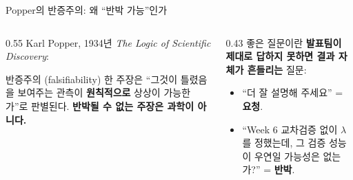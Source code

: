 \begin{frame}{Popper의 반증주의: 왜 ``반박 가능''인가}
  \begin{columns}[T]
    \begin{column}{0.55\textwidth}
      Karl Popper, 1934년 \textit{The Logic of Scientific
      Discovery}:
      \begin{block}{반증주의 (falsifiability)}
        한 주장은 ``그것이 틀렸음을 보여주는 관측이
        \textbf{원칙적으로} 상상이 가능한가''로 판별된다.
        \textbf{반박될 수 없는 주장은 과학이 아니다.}
      \end{block}
    \end{column}
    \begin{column}{0.43\textwidth}
      좋은 질문이란 \textbf{발표팀이 제대로 답하지 못하면
      결과 자체가 흔들리는} 질문:
      \begin{itemize}
        \item ``더 잘 설명해 주세요'' = \textbf{요청}.
        \item ``Week 6 교차검증 없이 $\lambda$를 정했는데, 그
          검증 성능이 우연일 가능성은 없는가?'' = \textbf{반박}.
      \end{itemize}
    \end{column}
  \end{columns}
\end{frame}
